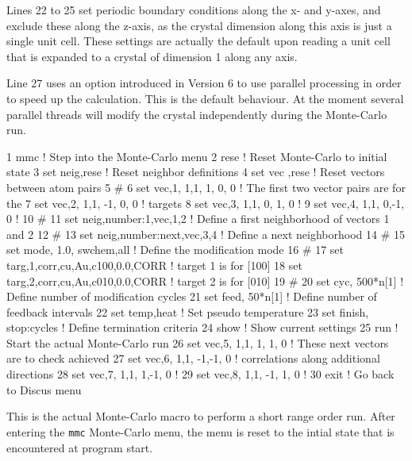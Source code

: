 Lines 22 to 25 set periodic boundary conditions along the x- and y-axes, and exclude
these along the z-axis, as the crystal dimension along this axis is just a 
single unit cell. These settings are actually the default upon reading a unit cell
that is expanded to a crystal of dimension 1 along any axis. 

Line 27 uses an option introduced in Version 6 to use parallel processing in 
order to speed up the calculation. This is the default behaviour. At the 
moment several parallel threads will modify the crystal independently during the
Monte-Carlo run. 


\begin{MacVerbatim}
  1  mmc                            ! Step into the Monte-Carlo menu
  2  rese                           ! Reset Monte-Carlo to initial state
  3  set neig,rese                  ! Reset neighbor definitions
  4  set vec ,rese                  ! Reset vectors between atom pairs
  5  #
  6  set vec,1, 1,1,  1, 0, 0       !  The first two vector pairs are for the 
  7  set vec,2, 1,1, -1, 0, 0       !  targets
  8  set vec,3, 1,1,  0, 1, 0       !
  9  set vec,4, 1,1,  0,-1, 0       !
 10  #
 11  set neig,number:1,vec,1,2      ! Define a first neighborhood of vectors 1 and 2
 12  #
 13  set neig,number:next,vec,3,4   ! Define a next neighborhood
 14  #
 15  set mode, 1.0, swchem,all      ! Define the modification mode
 16  #
 17  set targ,1,corr,cu,Au,c100,0.0,CORR  !  target 1 is for [100]
 18  set targ,2,corr,cu,Au,c010,0.0,CORR  !  target 2 is for [010]
 19  #
 20  set cyc, 500*n[1]              ! Define number of modification cycles
 21  set feed, 50*n[1]              ! Define number of feedback intervals
 22  set temp,heat                  ! Set pseudo temperature
 23  set finish, stop:cycles        ! Define termination criteria
 24  show                           ! Show current settings
 25  run                            ! Start the actual Monte-Carlo run
 26  set vec,5, 1,1,  1, 1, 0       ! These next vectors are to check achieved
 27  set vec,6, 1,1, -1,-1, 0       ! correlations along additional directions
 28  set vec,7, 1,1,  1,-1, 0       !
 29  set vec,8, 1,1, -1, 1, 0       !
 30  exit                           ! Go back to Discus menu
\end{MacVerbatim}

This is the actual Monte-Carlo macro to perform a short range order run. After
entering the {\tt mmc} Monte-Carlo menu, the menu is reset to the intial state
that is encountered at program start.

